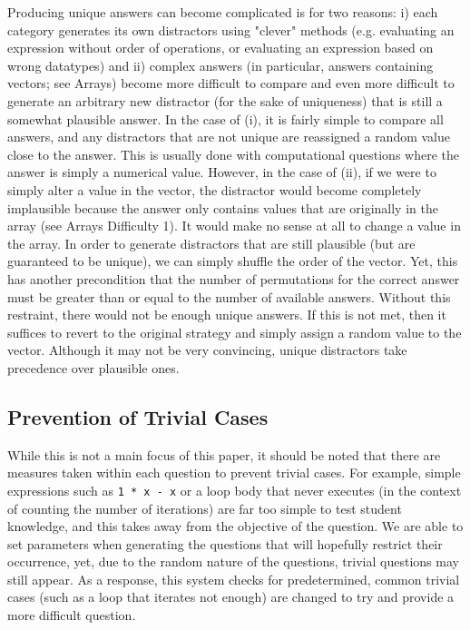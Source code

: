 \documentclass{article}
\begin{document}
Producing unique answers can become complicated is for two reasons: i) each category generates its own distractors using "clever" methods (e.g. evaluating an expression
without order of operations, or evaluating an expression based on wrong datatypes) and ii) complex answers
(in particular, answers containing vectors; see Arrays) become more difficult to compare and even more difficult
to generate an arbitrary new distractor (for the sake of uniqueness) that is still a somewhat plausible answer.
In the case of (i), it is fairly simple to compare all answers, and any distractors that are not unique are reassigned
a random value close to the answer. This is usually done with computational questions where the answer is simply a
numerical value. However, in the case of (ii), if we were to simply alter a value in the vector, the distractor would
become completely implausible because the answer only contains values that are originally in the array (see Arrays
Difficulty 1). It would make no sense at all to change a value in the array. In order to generate distractors that
are still plausible (but are guaranteed to be unique), we can simply shuffle the order of the vector. Yet, this has
another precondition that the number of permutations for the correct answer must be greater than or equal to the
number of available answers. Without this restraint, there would not be enough unique answers. If this is not met,
then it suffices to revert to the original strategy and simply assign a random value to the vector. Although it may
not be very convincing, unique distractors take precedence over plausible ones.

\subsection{Prevention of Trivial Cases}

While this is not a main focus of this paper, it should be noted that there are measures taken within each question to prevent trivial cases. For example, simple expressions such as \verb;1 * x - x; or a loop body that never executes (in the context of counting the number of iterations) are far too simple to test student knowledge, and this takes away from the objective of the question. We are able to set parameters when generating the questions that will hopefully restrict their occurrence, yet, due to the random nature of the questions, trivial questions may still appear. As a response, this system checks for predetermined, common trivial cases (such as a loop that iterates not enough) are changed to try and provide a more difficult question.
\end{document}
